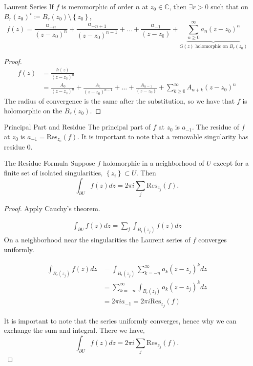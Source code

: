 \documentclass{article}
\begin{document}
\begin{thrm}{Laurent Series}{}
If \( f \) is meromorphic of order \( n \) at \(  z_0 \in \mathbb{C}  \), then \( \exists r>0 \) such that on \( B_{r} (z _0)^{\star }  \coloneqq  B_{r} (z_0) \setminus \left\{ z_0 \right\}   \),
\[
    f(z) = \frac{a_{- n}}{(z - z_0)^n} + \frac{a_{- n + 1}}{(z - z_0)^{n- 1} }+\dots + \frac{a_{- 1}}{(z - z_0)}+ \underbrace{\sum_{n\geq 0}^{\infty}   a_{n} (z - z_0)^n}_{G(z) \text{ holomorphic on } B_{r} (z_0) }
\]

\tcbline

\begin{proof}
\begin{align*}
    f(z) &= \frac{h(z)}{(z - z_0)^{n} } \\
    &= \frac{A_{0}}{(z - z_0)^n} + \frac{A_{1}}{(z - z_0)^{n- 1} }+\dots + \frac{A_{n - 1}}{(z - z_0)}+ \sum_{k\geq 0}^{\infty}   A_{n + k} (z - z_0)^n
\end{align*}
The radius of convergence is the same after the substitution, so we have that \( f \) is holomorphic on the \( B_{r} (z_0) \). 
\end{proof}

\end{thrm}

\begin{defn}{Principal Part and Residue}{}
The principal part of \( f \) at \( z_0 \) is \( a_{- 1}  \). The residue of \( f \) at \( z_0 \) is \( a_ {- 1} = \mathrm{Res}_{z_0}(f)   \). It is important to note that a removable singularity has residue 0. 
\end{defn}

\begin{thrm}{The Residue Formula}{}
Suppose \( f \) holomorphic in a neighborhood of \( \overline{U}  \) except for a finite set of isolated singularities, \( \left\{ z_{i}  \right\} \subset U \). Then 
\[
    \int _{\partial U} f(z) dz = 2\pi i \sum_{j} \mathrm{Res}_{z_{j} } (f). 
\]
\tcbline

\begin{proof}
Apply Cauchy's theorem. 

\begin{align*}
    \int _{\partial U} f(z) dz = \sum_{j} \int _{B_{\epsilon }(z_{j} ) } f(z) dz
\end{align*}
On a neighborhood near the singularities the Laurent series of \(f  \) converges uniformly.

\begin{align*}
    \int _{B_{\epsilon }(z_{j} ) } f(z) dz &= \int _{B_{\epsilon }(z_{j} ) } \sum_{k=- n }^{\infty} a_{k} (z - z_{j} )^k  dz\\
    &=\sum_{k=- n }^{\infty}  \int _{B_{\epsilon }(z_{j} ) } a_{k} (z - z_{j} )^k  dz\\
    &= 2\pi i a_{- 1} = 2\pi i \mathrm{ Res}_{z_{j} }(f) 
\end{align*}

It is important to note that the series uniformly converges, hence why we can exchange the sum and integral. There we have,
\[
    \int _{\partial U} f(z) dz = 2\pi i \sum_{j} \mathrm{Res}_{z_{j} } (f). 
\]
\end{proof}

\end{thrm}
\end{document}
